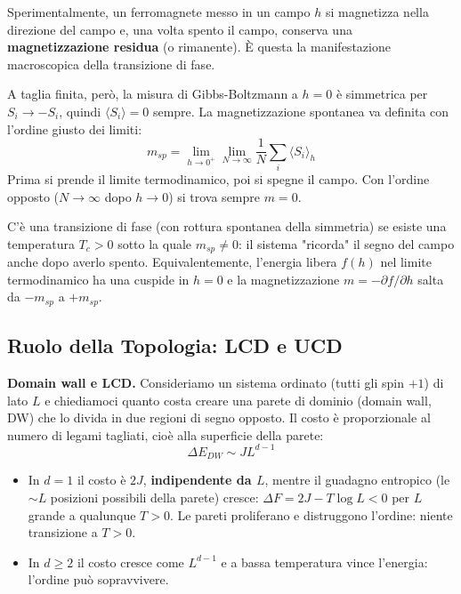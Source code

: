 Sperimentalmente, un ferromagnete messo in un campo $h$ si magnetizza nella direzione del campo e, una volta spento il campo, conserva una \textbf{magnetizzazione residua} (o rimanente). È questa la manifestazione macroscopica della transizione di fase.

\noindent A taglia finita, però, la misura di Gibbs-Boltzmann a $h=0$ è simmetrica per $S_i \to -S_i$, quindi $\langle S_i \rangle = 0$ sempre. La magnetizzazione spontanea va definita con l'ordine giusto dei limiti:
\begin{equation}
m_{sp} = \lim_{h \to 0^+} \lim_{N \to \infty} \frac{1}{N}\sum_i \langle S_i \rangle_h
\end{equation}
Prima si prende il limite termodinamico, poi si spegne il campo. Con l'ordine opposto ($N \to \infty$ dopo $h \to 0$) si trova sempre $m = 0$.

\begin{tcolorbox}[colback=yellow!25, colframe=yellow!75!orange, coltitle=black, title=\textbf{Transizione di fase}]
C'è una transizione di fase (con rottura spontanea della simmetria) se esiste una temperatura $T_c > 0$ sotto la quale $m_{sp} \neq 0$: il sistema "ricorda" il segno del campo anche dopo averlo spento. Equivalentemente, l'energia libera $f(h)$ nel limite termodinamico ha una cuspide in $h=0$ e la magnetizzazione $m = -\partial f / \partial h$ salta da $-m_{sp}$ a $+m_{sp}$.
\end{tcolorbox}

\subsection{Ruolo della Topologia: LCD e UCD}

\textbf{Domain wall e LCD.} Consideriamo un sistema ordinato (tutti gli spin $+1$) di lato $L$ e chiediamoci quanto costa creare una parete di dominio (domain wall, DW) che lo divida in due regioni di segno opposto. Il costo è proporzionale al numero di legami tagliati, cioè alla superficie della parete:
\begin{equation}
\Delta E_{DW} \sim J L^{d-1}
\end{equation}
\begin{itemize}
    \item In $d = 1$ il costo è $2J$, \textbf{indipendente da $L$}, mentre il guadagno entropico (le $\sim L$ posizioni possibili della parete) cresce: $\Delta F = 2J - T \log L < 0$ per $L$ grande a qualunque $T>0$. Le pareti proliferano e distruggono l'ordine: niente transizione a $T>0$.
    \item In $d \geq 2$ il costo cresce come $L^{d-1}$ e a bassa temperatura vince l'energia: l'ordine può sopravvivere.
\end{itemize}

